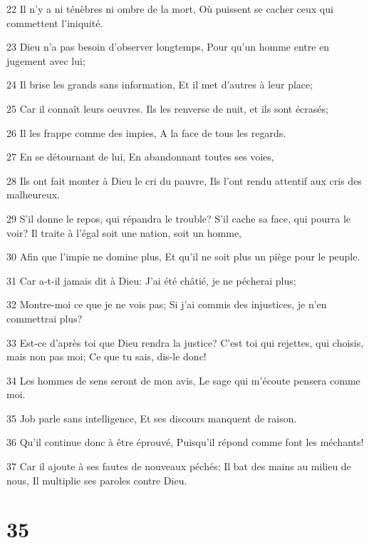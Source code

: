 \par 22 Il n'y a ni ténèbres ni ombre de la mort, Où puissent se cacher ceux qui commettent l'iniquité.
\par 23 Dieu n'a pas besoin d'observer longtemps, Pour qu'un homme entre en jugement avec lui;
\par 24 Il brise les grands sans information, Et il met d'autres à leur place;
\par 25 Car il connaît leurs oeuvres. Ils les renverse de nuit, et ils sont écrasés;
\par 26 Il les frappe comme des impies, A la face de tous les regards.
\par 27 En se détournant de lui, En abandonnant toutes ses voies,
\par 28 Ils ont fait monter à Dieu le cri du pauvre, Ils l'ont rendu attentif aux cris des malheureux.
\par 29 S'il donne le repos, qui répandra le trouble? S'il cache sa face, qui pourra le voir? Il traite à l'égal soit une nation, soit un homme,
\par 30 Afin que l'impie ne domine plus, Et qu'il ne soit plus un piège pour le peuple.
\par 31 Car a-t-il jamais dit à Dieu: J'ai été châtié, je ne pécherai plus;
\par 32 Montre-moi ce que je ne vois pas; Si j'ai commis des injustices, je n'en commettrai plus?
\par 33 Est-ce d'après toi que Dieu rendra la justice? C'est toi qui rejettes, qui choisis, mais non pas moi; Ce que tu sais, dis-le donc!
\par 34 Les hommes de sens seront de mon avis, Le sage qui m'écoute pensera comme moi.
\par 35 Job parle sans intelligence, Et ses discours manquent de raison.
\par 36 Qu'il continue donc à être éprouvé, Puisqu'il répond comme font les méchants!
\par 37 Car il ajoute à ses fautes de nouveaux péchés; Il bat des mains au milieu de nous, Il multiplie ses paroles contre Dieu.

\chapter{35}

